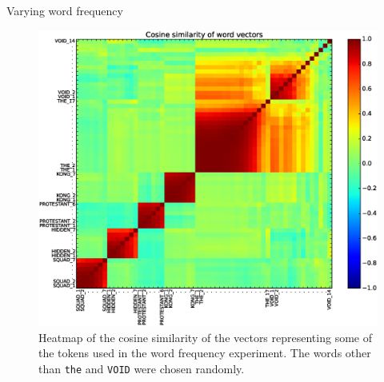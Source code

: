 \documentclass{article} %
\newcommand{\word}[1]{\texttt{#1}}
\begin{document}
\begin{section}{Varying word frequency}
\begin{figure}
	\includegraphics[scale=0.5]{word-frequency-experiment-heatmap}
	\caption{ Heatmap of the cosine similarity of the vectors
          representing some of the tokens used in the word frequency
          experiment.  The words other than \word{the} and \word{VOID}
          were chosen randomly.  }
	\label{word-frequency-experiment-heatmap}
\end{figure}

\begin{table}
	
	\caption{ Words in the original vocabulary most similar to the
          tokens \word{THE\_i}, and their cosine similarity with the
          most frequent such token, \word{THE\_1}.  It is apparent from
          the nearest neighbour list that the vectors of the
          low-frequency tokens have not been adequately trained.  }
	\label{word-frequency-experiment-cosine-similarity}
\end{table}


\end{section}
\end{document}
